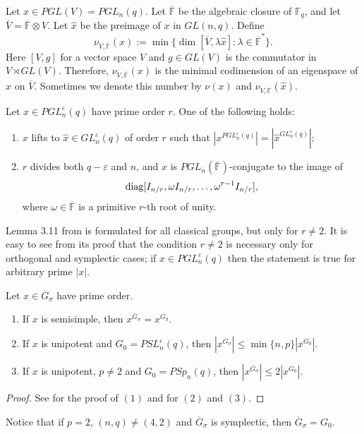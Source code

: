 \begin{Def}
\label{nudef}
Let $x \in PGL(V)=PGL_n(q)$. Let $\overline{\mathbb{F}}$ be the algebraic closure of $\mathbb{F}_q$, and let $\overline{V}=\overline{\mathbb{F}} \otimes V.$ Let $\hat{x}$ be the preimage of $x$ in $GL(n,q).$ Define
$$ \nu_{V, \overline{\mathbb{F}}}(x):= \min\{\dim [\overline{V}, \lambda \hat{x}] : \lambda \in \overline{\mathbb{F}}^* \}. $$ Here $[V,g]$ for a vector space $V$ and $g \in GL(V)$ is the commutator in $V \rtimes GL(V)$.  Therefore, $\nu_{V, \overline{\mathbb{F}}}(x)$ is  the minimal codimension of an eigenspace of $\hat{x}$  on $\overline{V}$.  Sometimes we denote this number by $\nu(x)$ and $\nu_{V, \overline{\mathbb{F}}}(\hat{x})$. 
\end{Def}

\begin{Lem}\label{prost}  %
Let $x \in PGL^{\varepsilon}_n(q)$ have  prime order $r.$ One of the following holds: 
\begin{enumerate}[font=\normalfont]
\item $x$ lifts to  $\hat{x} \in GL^{\varepsilon}_n(q)$ of order $r$ such that $|x^{PGL^{\varepsilon}_n(q)}|=|\hat{x}^{GL^{\varepsilon}_n(q)}|;$ \label{prost1}
\item $r$ divides both $q-\varepsilon$ and $n$, and $x$ is $PGL_n(\overline{\mathbb{F}})$-conjugate to the image of $$\mathrm{diag}[I_{n/r}, \omega I_{n/r}, \ldots , \omega^{r-1} I_{n/r} ],$$ where $\omega \in \overline{\mathbb{F}}$ is a primitive $r$-th root of unity. \label{prost2}
\end{enumerate} 
\end{Lem}

\begin{Rem}
Lemma 3.11 from \cite{fpr2} is formulated for   all classical groups, but only for $r \ne 2$. It is easy to see  from its proof  that the condition $r\ne 2$ is necessary only for orthogonal and symplectic cases; if $x \in PGL^{\varepsilon}_n(q)$ then the statement is true for arbitrary prime $|x|.$  
\end{Rem}



\begin{Lem}\label{xGoGs}
Let $x \in \overline{G}_{\sigma}$ have prime order.
\begin{enumerate}[font=\normalfont]
\item If $x$ is semisimple, then $x^{\overline{G}_{\sigma}}=x^{G_0}.$
\item If $x$ is unipotent and $G_0=PSL_n^{\varepsilon}(q)$, then $|x^{\overline{G}_{\sigma}}| \le \min\{n,p\}|x^{G_0}|.$
\item If $x$ is unipotent, $p\ne 2$ and $G_0=PSp_n(q)$, then $|x^{\overline{G}_{\sigma}}| \le 2|x^{G_0}|.$  
\end{enumerate} 
\end{Lem}
\begin{proof}
See \cite[4.2.2(j)]{gorlyo} for the proof of $(1)$ and \cite[Lemma 3.20]{fpr2} for $(2)$ and $(3).$
\end{proof}
Notice that if $p=2$, $(n,q)\ne (4,2)$ and $\overline{G}_{\sigma}$ is symplectic, then $\overline{G}_{\sigma}=G_0.$

